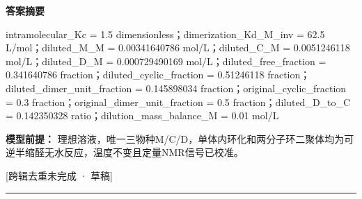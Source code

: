 \documentclass[UTF8,11pt,a4paper]{ctexart}
\begin{document}
\noindent\textbf{答案摘要}\par
intramolecular\_Kc = 1.5 dimensionless；dimerization\_Kd\_M\_inv = 62.5 L/mol；diluted\_M\_M = 0.00341640786 mol/L；diluted\_C\_M = 0.0051246118 mol/L；diluted\_D\_M = 0.000729490169 mol/L；diluted\_free\_fraction = 0.341640786 fraction；diluted\_cyclic\_fraction = 0.51246118 fraction；diluted\_dimer\_unit\_fraction = 0.145898034 fraction；original\_cyclic\_fraction = 0.3 fraction；original\_dimer\_unit\_fraction = 0.5 fraction；diluted\_D\_to\_C = 0.142350328 ratio；dilution\_mass\_balance\_M = 0.01 mol/L\par
\noindent\textbf{模型前提：}
理想溶液，唯一三物种M/C/D，单体内环化和两分子环二聚体均为可逆半缩醛无水反应，温度不变且定量NMR信号已校准。\par
\noindent\textcolor{red!65!black}{[跨辑去重未完成 · 草稿]} \par
\medskip\hrule\medskip
{}
\end{document}
